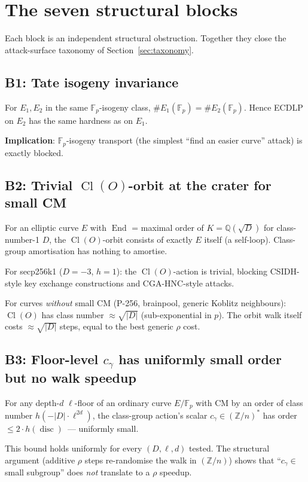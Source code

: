 \documentclass[11pt,a4paper]{article}
\theoremstyle{definition}
\newcommand{\FF}{\mathbb{F}}
\newcommand{\ZZ}{\mathbb{Z}}
\newcommand{\QQ}{\mathbb{Q}}
\newcommand{\End}{\operatorname{End}}
\newcommand{\Cl}{\operatorname{Cl}}
\newcommand{\disc}{\operatorname{disc}}
\begin{document}
\section{The seven structural blocks}\label{sec:blocks}

Each block is an independent structural obstruction. Together they
close the attack-surface taxonomy of Section~\ref{sec:taxonomy}.

\subsection*{B1: Tate isogeny invariance}

For $E_1, E_2$ in the same $\FF_p$-isogeny class,
$\#E_1(\FF_p) = \#E_2(\FF_p)$. Hence ECDLP on $E_2$ has the same
hardness as on $E_1$.

\textbf{Implication}: $\FF_p$-isogeny transport (the simplest
``find an easier curve'' attack) is exactly blocked.

\subsection*{B2: Trivial $\Cl(O)$-orbit at the crater for small CM}

For an elliptic curve $E$ with $\End$ = maximal order of
$K = \QQ(\sqrt{D})$ for class-number-1 $D$, the $\Cl(O)$-orbit
consists of exactly $E$ itself (a self-loop). Class-group
amortisation has nothing to amortise.

For secp256k1 ($D = -3$, $h = 1$): the $\Cl(O)$-action is trivial,
blocking CSIDH-style key exchange constructions and CGA-HNC-style
attacks.

For curves \emph{without} small CM (P-256, brainpool, generic
Koblitz neighbours): $\Cl(O)$ has class number $\approx \sqrt{|D|}$
(sub-exponential in $p$). The orbit walk itself costs $\approx
\sqrt{|D|}$ steps, equal to the best generic $\rho$ cost.

\subsection*{B3: Floor-level $c_\gamma$ has uniformly small order but
no walk speedup}

For any depth-$d$ $\ell$-floor of an ordinary curve $E/\FF_p$ with
CM by an order of class number $h(-|D| \cdot \ell^{2d})$, the
class-group action's scalar $c_\gamma \in (\ZZ/n)^*$ has order
$\leq 2 \cdot h(\disc)$~--- uniformly small.

This bound holds uniformly for every $(D, \ell, d)$ tested. The
structural argument (additive $\rho$ steps re-randomise the walk
in $(\ZZ/n)$) shows that ``$c_\gamma \in$ small subgroup'' does
\emph{not} translate to a $\rho$ speedup.
\end{document}
